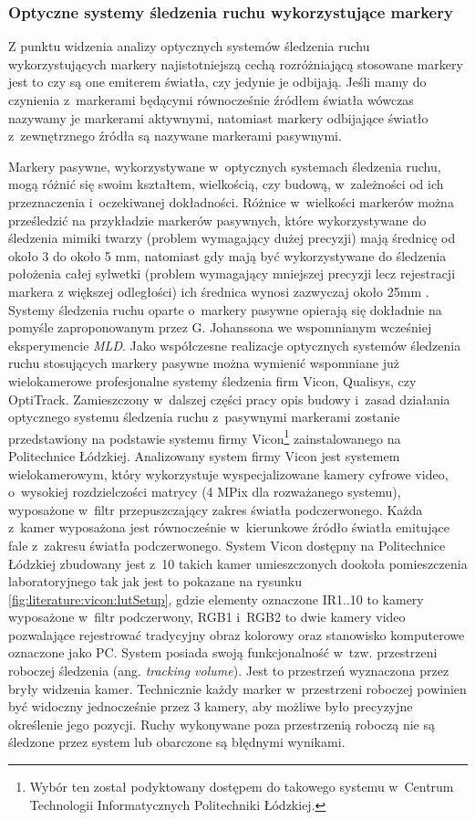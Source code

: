 \subsubsection*{Optyczne systemy śledzenia ruchu wykorzystujące markery}
Z punktu widzenia analizy optycznych systemów śledzenia ruchu wykorzystujących markery najistotniejszą cechą rozróżniającą stosowane markery jest to czy są one emiterem światła, czy jedynie je odbijają. Jeśli mamy do czynienia z~markerami będącymi równocześnie źródłem światła wówczas nazywamy je markerami aktywnymi, natomiast markery odbijające światło z~zewnętrznego źródła są nazywane markerami pasywnymi.

Markery pasywne, wykorzystywane w~optycznych systemach śledzenia ruchu, mogą różnić się swoim kształtem, wielkością, czy budową, w~zależności od ich przeznaczenia i~oczekiwanej dokładności. Różnice w~wielkości markerów można prześledzić na przykładzie markerów pasywnych, które wykorzystywane do śledzenia mimiki twarzy (problem wymagający dużej precyzji) mają średnicę od około 3 do około 5 mm, natomiast gdy mają być wykorzystywane do śledzenia położenia całej sylwetki (problem wymagający mniejszej precyzji lecz rejestracji markera z większej odległości) ich średnica wynosi zazwyczaj około 25mm . Systemy śledzenia ruchu oparte o~markery pasywne opierają się dokładnie na pomyśle zaproponowanym przez G. Johanssona we wspomnianym wcześniej eksperymencie \textsl{MLD}. Jako współczesne realizacje optycznych systemów śledzenia ruchu stosujących markery pasywne można wymienić wspomniane już wielokamerowe profesjonalne systemy śledzenia firm Vicon, Qualisys, czy OptiTrack. 
Zamieszczony w~dalszej części pracy opis budowy i~zasad działania optycznego systemu śledzenia ruchu z~pasywnymi markerami zostanie przedstawiony na podstawie systemu firmy Vicon\footnote{Wybór ten został podyktowany dostępem do takowego systemu w~Centrum Technologii Informatycznych Politechniki Łódzkiej.} zainstalowanego na Politechnice Łódzkiej. 
Analizowany system firmy Vicon jest systemem wielokamerowym, który wykorzystuje wyspecjalizowane kamery cyfrowe video, o~wysokiej rozdzielczości matrycy (4 MPix dla rozważanego systemu), wyposażone w~filtr przepuszczający zakres światła podczerwonego. Każda z~kamer wyposażona jest równocześnie w~kierunkowe źródło światła emitujące fale z~zakresu światła podczerwonego. System Vicon dostępny na Politechnice Łódzkiej zbudowany jest z~10 takich kamer umieszczonych dookoła pomieszczenia laboratoryjnego tak jak jest to pokazane na rysunku \ref{fig:literature:vicon:lutSetup}, gdzie elementy oznaczone IR1..10 to kamery wyposażone w~filtr podczerwony, RGB1 i~RGB2 to dwie kamery video pozwalające rejestrować tradycyjny obraz kolorowy oraz stanowisko komputerowe oznaczone jako PC. System posiada swoją funkcjonalność w~tzw. przestrzeni roboczej śledzenia (ang. \textsl{tracking volume}). Jest to przestrzeń wyznaczona przez bryły widzenia kamer. Technicznie każdy marker w~przestrzeni roboczej powinien być widoczny jednocześnie przez 3 kamery, aby możliwe było precyzyjne określenie jego pozycji. Ruchy wykonywane poza przestrzenią roboczą nie są śledzone przez system lub obarczone są błędnymi wynikami.

